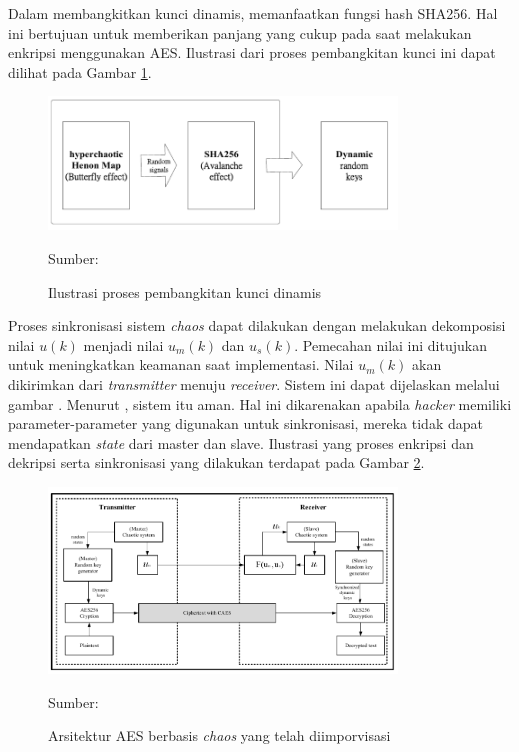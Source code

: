 Dalam membangkitkan kunci dinamis, \textcite{lin2021} memanfaatkan fungsi hash SHA256. Hal ini bertujuan untuk memberikan panjang yang cukup pada saat melakukan enkripsi menggunakan AES. Ilustrasi dari proses pembangkitan kunci ini dapat dilihat pada Gambar \ref{fig:lin.keygen}.

\begin{figure}[!h]
  \centering
  \includegraphics[width=350px]{chapters/res/chapter-2/img/lin.keygen.png}
  \caption{Ilustrasi proses pembangkitan kunci dinamis} \label{fig:lin.keygen}
  Sumber: \textcite{lin2021}
\end{figure}

Proses sinkronisasi sistem \emph{chaos} dapat dilakukan dengan melakukan dekomposisi nilai $u(k)$ menjadi nilai $u_m(k)$ dan $u_s(k)$. Pemecahan nilai ini ditujukan untuk meningkatkan keamanan saat implementasi. Nilai $u_m(k)$ akan dikirimkan dari \emph{transmitter} menuju \emph{receiver}. Sistem ini dapat dijelaskan melalui gambar . Menurut \textcite{lin2021}, sistem itu aman. Hal ini dikarenakan apabila \emph{hacker} memiliki parameter-parameter yang digunakan untuk sinkronisasi, mereka tidak dapat mendapatkan \emph{state} dari master dan slave. Ilustrasi yang proses enkripsi dan dekripsi serta sinkronisasi yang dilakukan terdapat pada Gambar \ref{fig:lin.caes}.

\begin{figure}[!h]
  \centering
  \includegraphics[width=350px]{chapters/res/chapter-2/img/lin.caes.png}
  \caption{Arsitektur AES berbasis \emph{chaos} yang telah diimporvisasi} \label{fig:lin.caes}
  Sumber: \textcite{lin2021}
\end{figure}

